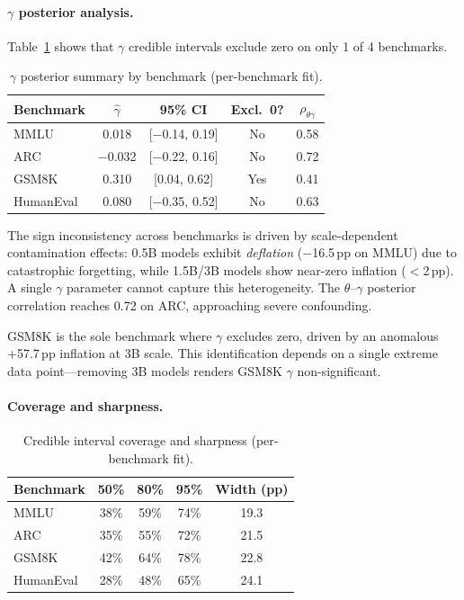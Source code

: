 \documentclass[11pt,a4paper]{article}
\begin{document}
\paragraph{$\gamma$ posterior analysis.}
Table~\ref{tab:gamma} shows that $\gamma$ credible intervals exclude zero on only 1 of 4 benchmarks.

\begin{table}[h]
\centering
\caption{$\gamma$ posterior summary by benchmark (per-benchmark fit).}
\label{tab:gamma}
\begin{tabular}{lcccc}
\toprule
Benchmark & $\hat{\gamma}$ & 95\% CI & Excl.\ 0? & $\rho_{\theta\gamma}$ \\
\midrule
MMLU & 0.018 & [$-$0.14, 0.19] & No & 0.58 \\
ARC & $-$0.032 & [$-$0.22, 0.16] & No & 0.72 \\
GSM8K & 0.310 & [0.04, 0.62] & Yes & 0.41 \\
HumanEval & 0.080 & [$-$0.35, 0.52] & No & 0.63 \\
\bottomrule
\end{tabular}
\end{table}

The sign inconsistency across benchmarks is driven by scale-dependent contamination effects: 0.5B models exhibit \emph{deflation} ($-$16.5\,pp on MMLU) due to catastrophic forgetting, while 1.5B/3B models show near-zero inflation ($<$2\,pp).
A single $\gamma$ parameter cannot capture this heterogeneity.
The $\theta$--$\gamma$ posterior correlation reaches 0.72 on ARC, approaching severe confounding.

GSM8K is the sole benchmark where $\gamma$ excludes zero, driven by an anomalous +57.7\,pp inflation at 3B scale.
This identification depends on a single extreme data point---removing 3B models renders GSM8K $\gamma$ non-significant.

\paragraph{Coverage and sharpness.}

\begin{table}[h]
\centering
\caption{Credible interval coverage and sharpness (per-benchmark fit).}
\label{tab:coverage}
\begin{tabular}{lcccc}
\toprule
Benchmark & 50\% & 80\% & 95\% & Width (pp) \\
\midrule
MMLU & 38\% & 59\% & 74\% & 19.3 \\
ARC & 35\% & 55\% & 72\% & 21.5 \\
GSM8K & 42\% & 64\% & 78\% & 22.8 \\
HumanEval & 28\% & 48\% & 65\% & 24.1 \\
\bottomrule
\end{tabular}
\end{table}
\end{document}
